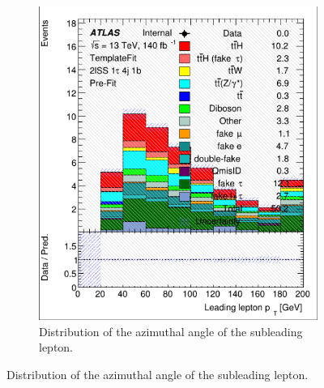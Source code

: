 \begin{figure}[htb!]
\begin{subfigure}{0.45\textwidth}
        \includegraphics[width=\linewidth]{figures/plots/histograms/lep_Phi_1.png}
        \caption{Distribution of the azimuthal angle of the subleading lepton.}
        \label{fig:lep_Phi_1}
    \end{subfigure}

    \vspace{0.5cm}


\end{figure}
